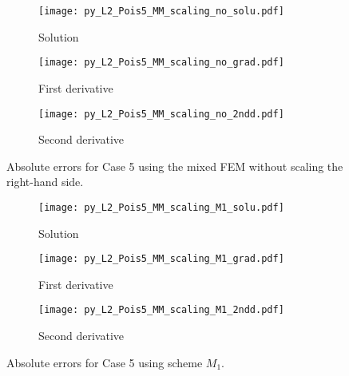 \documentclass[review,3p]{elsarticle}
\begin{document}
\begin{figure}[!ht]
    \begin{subfigure}{5.5cm}
        \texttt{[image: py\_L2\_Pois5\_MM\_scaling\_no\_solu.pdf]}
        \caption{Solution}
        \label{py_L2_Pois5_MM_scaling_no_solu}
    \end{subfigure}
    \hspace{-0.2cm}
    \begin{subfigure}{5.5cm}
        \texttt{[image: py\_L2\_Pois5\_MM\_scaling\_no\_grad.pdf]}
        \caption{First derivative}
        \label{py_L2_Pois5_MM_scaling_no_grad}
    \end{subfigure}
    \hspace{-0.2cm}
    \begin{subfigure}{5.5cm}
        \texttt{[image: py\_L2\_Pois5\_MM\_scaling\_no\_2ndd.pdf]}
        \caption{Second derivative}
        \label{py_L2_Pois5_MM_scaling_no_2ndd}
    \end{subfigure}
\caption{Absolute errors for Case 5 using the mixed FEM without scaling the right-hand side.}
\label{py_L2_Pois5_MM_scaling_no}
\end{figure}

\begin{figure}[!ht]
    \begin{subfigure}{5.5cm}
        \texttt{[image: py\_L2\_Pois5\_MM\_scaling\_M1\_solu.pdf]}
        \caption{Solution}
        \label{py_L2_Pois5_MM_scaling_M1_solu}
    \end{subfigure}
    \hspace{-0.2cm}
    \begin{subfigure}{5.5cm}
        \texttt{[image: py\_L2\_Pois5\_MM\_scaling\_M1\_grad.pdf]}
        \caption{First derivative}
        \label{py_L2_Pois5_MM_scaling_M1_grad}
    \end{subfigure}
    \hspace{-0.2cm}
    \begin{subfigure}{5.5cm}
        \texttt{[image: py\_L2\_Pois5\_MM\_scaling\_M1\_2ndd.pdf]}
        \caption{Second derivative}
        \label{py_L2_Pois5_MM_scaling_M1_2ndd}
    \end{subfigure}
\caption{Absolute errors for Case 5 using scheme $M_1$.}
\label{py_L2_Pois5_MM_scaling_M1}
\end{figure}
\end{document}
